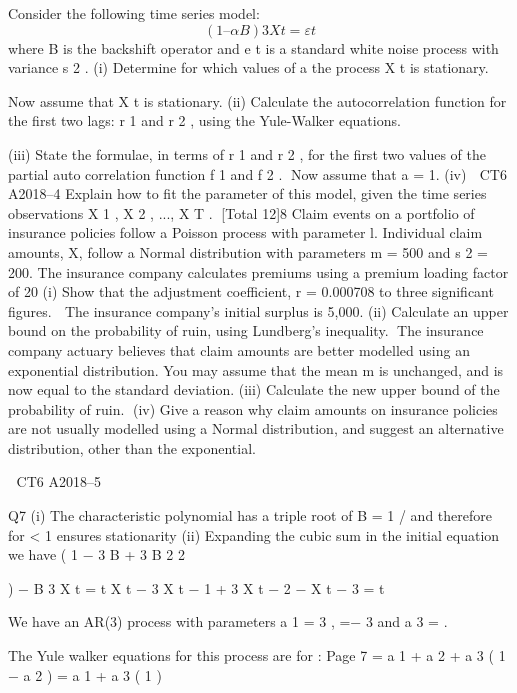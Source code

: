 \documentclass[a4paper,12pt]{article}
\begin{document}
 

Consider the following time series model:
\[(1 – \alpha B) 3 X t = \varepsilon t\]
where B is the backshift operator and e t is a standard white noise process with
variance s 2 .
(i)
Determine for which values of a the process X t is stationary.

Now assume that X t is stationary.
(ii) Calculate the autocorrelation function for the first two lags: r 1 and r 2 , using
the Yule-Walker equations.

(iii) State the formulae, in terms of r 1 and r 2 , for the first two values of the partial
auto correlation function f 1 and f 2 .
Now assume that a = 1.
(iv)

CT6 A2018–4
Explain how to fit the parameter of this model, given the time series
observations X 1 , X 2 , ..., X T .
[Total 12]8
Claim events on a portfolio of insurance policies follow a Poisson process with
parameter l. Individual claim amounts, X, follow a Normal distribution with
parameters m = 500 and s 2 = 200.
The insurance company calculates premiums using a premium loading factor of 20%
(i)
Show that the adjustment coefficient, r = 0.000708 to three significant figures.

The insurance company’s initial surplus is 5,000.
(ii)
Calculate an upper bound on the probability of ruin, using Lundberg’s
inequality.
The insurance company actuary believes that claim amounts are better modelled using
an exponential distribution. You may assume that the mean m is unchanged, and is
now equal to the standard deviation.
(iii) Calculate the new upper bound of the probability of ruin.
(iv) Give a reason why claim amounts on insurance policies are not usually
modelled using a Normal distribution, and suggest an alternative distribution,
other than the exponential.


CT6 A2018–5 

Q7
(i) The characteristic polynomial has a triple root of B = 1 / \alpha 
and therefore for \alpha  < 1 ensures stationarity
(ii) Expanding the cubic sum in the initial equation we have
( 1 − 3 \alpha  B + 3 \alpha  B
2 2


)
−  B 3 X t = \varepsilon t
X t − 3 \alpha  X t − 1 + 3  X t − 2 −  X t − 3 = \varepsilon t

We have an AR(3) process with parameters a 1 = 3 \alpha  ,  =− 3  and a 3 = 
.

The Yule walker equations for this process are for  :
Page 7 %
 = a 1 + a 2  + a 3 
 ( 1 − a 2 ) =           
a 1 + a 3 
( 1 )
\end{document}
